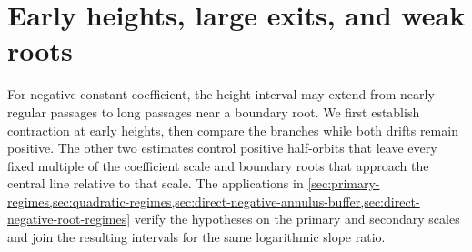 \section{Early heights, large exits, and weak roots}
\label{sec:recurring-ranges}

For negative constant coefficient, the height interval may extend
from nearly regular passages to long passages near a boundary root.
We first establish contraction at early heights, then compare the
branches while both drifts remain positive. The other two estimates
control positive half-orbits that leave every fixed multiple of the
coefficient scale and boundary roots that approach the central line
relative to that scale. The applications in
\cref{sec:primary-regimes,sec:quadratic-regimes,sec:direct-negative-annulus-buffer,sec:direct-negative-root-regimes}
verify the hypotheses on the primary and secondary scales and join
the resulting intervals for the same logarithmic slope ratio.
